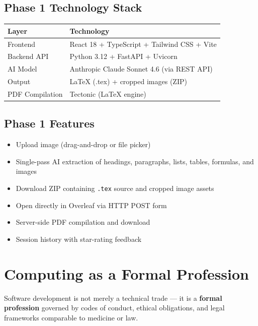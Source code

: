 \documentclass[12pt,a4paper]{article}
\begin{document}
\subsection{Phase 1 Technology Stack}
\begin{center}
\begin{tabular}{ll}
  \toprule
  \textbf{Layer} & \textbf{Technology} \\
  \midrule
  Frontend        & React 18 + TypeScript + Tailwind CSS + Vite \\
  Backend API     & Python 3.12 + FastAPI + Uvicorn \\
  AI Model        & Anthropic Claude Sonnet 4.6 (via REST API) \\
  Output          & \LaTeX{} (.tex) + cropped images (ZIP) \\
  PDF Compilation & Tectonic (\LaTeX{} engine) \\
  \bottomrule
\end{tabular}
\end{center}

\subsection{Phase 1 Features}
\begin{itemize}[noitemsep]
  \item Upload image (drag-and-drop or file picker)
  \item Single-pass AI extraction of headings, paragraphs, lists, tables, formulas, and images
  \item Download ZIP containing \texttt{.tex} source and cropped image assets
  \item Open directly in Overleaf via HTTP POST form
  \item Server-side PDF compilation and download
  \item Session history with star-rating feedback
\end{itemize}


\section{Computing as a Formal Profession}

Software development is not merely a technical trade — it is a \textbf{formal profession} governed
by codes of conduct, ethical obligations, and legal frameworks comparable to medicine or law.
\end{document}
